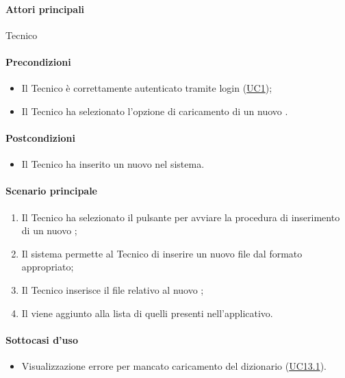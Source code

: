 \paragraph*{Attori principali} Tecnico

\paragraph*{Precondizioni}
\begin{itemize}
  \item Il Tecnico è correttamente autenticato tramite login (\hyperref[UC1]{UC1});
  \item Il Tecnico ha selezionato l’opzione di caricamento di un nuovo .  
\end{itemize}

\paragraph*{Postcondizioni}
\begin{itemize}
  \item Il Tecnico ha inserito un nuovo  nel sistema.
\end{itemize}

\paragraph*{Scenario principale}
\begin{enumerate}
  \item Il Tecnico ha selezionato il pulsante per avviare la procedura di inserimento di un nuovo ;
  \item Il sistema permette al Tecnico di inserire un nuovo file dal formato appropriato;
  \item Il Tecnico inserisce il file relativo al nuovo ;
  \item Il  viene aggiunto alla lista di quelli presenti nell’applicativo.  
\end{enumerate}

\paragraph*{Sottocasi d'uso}
\begin{itemize}
  \item Visualizzazione errore per mancato caricamento del dizionario (\hyperref[UC13point1]{UC13.1}).
\end{itemize}


